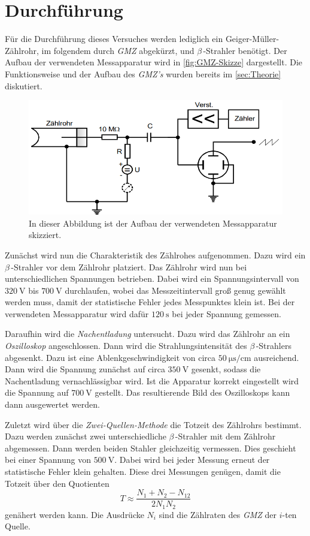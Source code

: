 \section{Durchführung}
\label{sec:Durchführung}
Für die Durchführung dieses Versuches werden lediglich ein Geiger-Müller-Zählrohr, im folgendem durch \textit{GMZ} abgekürzt, und $\beta$\,-Strahler benötigt. Der Aufbau der
verwendeten Messapparatur wird in \autoref{fig:GMZ-Skizze} dargestellt. Die Funktionsweise und der Aufbau des \textit{GMZ's} wurden bereits im \autoref{sec:Theorie} diskutiert.

\begin{figure}
    \centering
    \includegraphics[width = .8\textwidth]{content/Messapparatur.PNG}
    \caption{In dieser Abbildung ist der Aufbau der verwendeten Messapparatur skizziert. \cite{v703}}
    \label{fig:GMZ-Skizze}
\end{figure}

Zunächst wird nun die Charakteristik des Zählrohes aufgenommen. Dazu wird ein $\beta$\,-Strahler vor dem Zählrohr platziert. Das Zählrohr wird nun bei unterschiedlichen
Spannungen betrieben. Dabei wird ein Spannungsintervall von $\qty{320}{\volt}$ bis $\qty{700}{\volt}$ durchlaufen, wobei das Messzeitintervall groß genug gewählt werden muss, damit
der statistische Fehler jedes Messpunktes klein ist. Bei der verwendeten Messapparatur wird dafür $\qty{120}{\second}$ bei jeder Spannung gemessen. 

Daraufhin wird die \textit{Nachentladung} untersucht. Dazu wird das Zählrohr an ein \textit{Oszilloskop} angeschlossen. Dann wird die Strahlungsintensität des 
$\beta$\,-Strahlers abgesenkt. Dazu ist eine Ablenkgeschwindigkeit von circa $\qty{50}{\micro\second\per\centi\metre}$ ausreichend. Dann wird die Spannung zunächst auf circa
$\qty{350}{\volt}$ gesenkt, sodass die Nachentladung vernachlässigbar wird. Ist die Apparatur korrekt eingestellt wird die Spannung auf $\qty{700}{\volt}$ gestellt. Das 
resultierende Bild des Oszilloskops kann dann ausgewertet werden. 

Zuletzt wird über die \textit{Zwei-Quellen-Methode} die Totzeit des Zählrohrs bestimmt. Dazu werden zunächst zwei unterschiedliche $\beta$\,-Strahler mit dem Zählrohr 
abgemessen. Dann werden beiden Stahler gleichzeitig vermessen. Dies geschieht bei einer Spannung von $\qty{500}{\volt}$. Dabei wird bei jeder Messung erneut der statistische
Fehler klein gehalten. Diese drei Messungen genügen, damit die Totzeit über den Quotienten
\begin{equation}
    \label{eqn:2_Quellen}
    T \approx \frac{N_1 + N_2 - N_{12}}{2N_1 N_2}
\end{equation}
genähert werden kann. Die Ausdrücke $N_i$ sind die Zählraten des \textit{GMZ} der $i$-ten Quelle.
